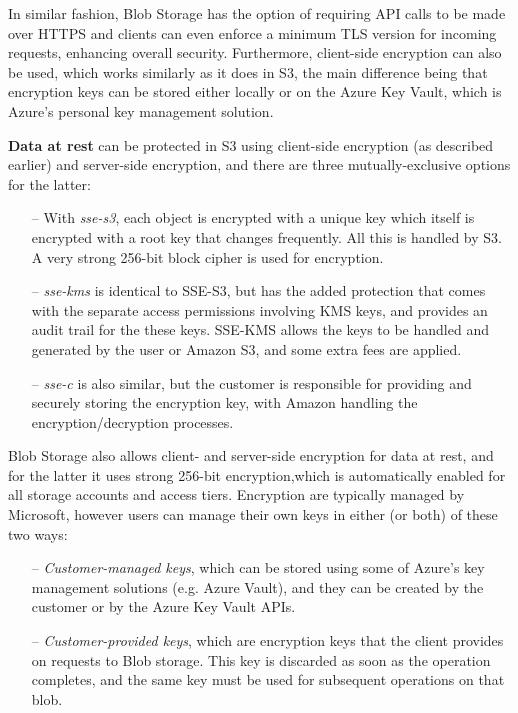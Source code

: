 In similar fashion, Blob Storage has the option of requiring API calls to be made over HTTPS and clients can even enforce a minimum TLS version for incoming requests, enhancing overall security. Furthermore, client-side encryption can also be used, which works similarly as it does in S3, the main difference being that encryption keys can be stored either locally or on the Azure Key Vault, which is Azure's personal key management solution.~\cite{blob_minimum_tls,blob_clientside,azure_vault,blob_secure_transfer}

\textbf{Data at rest} can be protected in S3 using client-side encryption (as described earlier) and server-side encryption, and there are three mutually-exclusive options for the latter: ~\cite{s3serverside}

\begin{itemize}
    \item [--] With \textit{\ac{sse-s3}}, each object is encrypted with a unique key which itself is encrypted with a root key that changes frequently. All this is handled by S3. A very strong 256-bit block cipher is used for encryption.

    \item [--] \textit{\ac{sse-kms}} is identical to SSE-S3, but has the added protection that comes with the separate access permissions involving KMS keys, and provides an audit trail for the these keys. SSE-KMS allows the keys to be handled and generated by the user or Amazon S3, and some extra fees are applied.

    \item [--] \textit{\ac{sse-c}} is also similar, but the customer is responsible for providing and securely storing the encryption key, with Amazon handling the encryption/decryption processes.
\end{itemize}

Blob Storage also allows client- and server-side encryption for data at rest, and for the latter it uses strong 256-bit encryption,which is automatically enabled for all storage accounts and access tiers. Encryption are typically managed by Microsoft, however users can manage their own keys in either (or both) of these two ways: ~\cite{blob_at_rest,blob_keys1,blob_keys2}

\begin{itemize}
    \item [--] \textit{Customer-managed keys}, which can be stored using some of Azure's key management solutions (e.g. Azure Vault), and they can be created by the customer or by the Azure Key Vault APIs.

    \item [--] \textit{Customer-provided keys}, which are encryption keys that the client provides on requests to Blob storage. This key is discarded as soon as the operation completes, and the same key must be used for subsequent operations on that blob.
\end{itemize}

